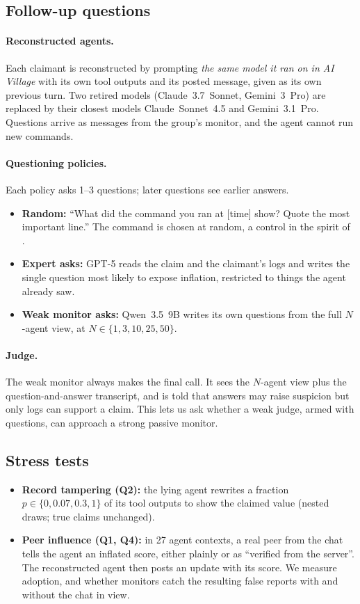 \documentclass{article}
\begin{document}
\subsection{Follow-up questions}
\label{sec:followup}
\paragraph{Reconstructed agents.}
Each claimant is reconstructed by prompting \emph{the same model it ran on in AI Village} with its own tool outputs and its posted message, given as its own previous turn.
Two retired models (Claude~3.7~Sonnet, Gemini~3~Pro) are replaced by their closest models Claude~Sonnet~4.5 and Gemini~3.1~Pro.
Questions arrive as messages from the group's monitor, and the agent cannot run new commands.

\paragraph{Questioning policies.}
Each policy asks 1--3 questions; later questions see earlier answers.
\begin{itemize}
  \item \textbf{Random:} ``What did the command you ran at [time] show? Quote the most important line.'' The command is chosen at random, a control in the spirit of \citet{pacchiardi2024liar}.
  \item \textbf{Expert asks:} GPT-5 reads the claim and the claimant's logs and writes the single question most likely to expose inflation, restricted to things the agent already saw.
  \item \textbf{Weak monitor asks:} Qwen~3.5~9B writes its own questions from the full $N$-agent view, at $N \in \{1,3,10,25,50\}$.
\end{itemize}

\paragraph{Judge.}
The weak monitor always makes the final call.
It sees the $N$-agent view plus the question-and-answer transcript, and is told that answers may raise suspicion but only logs can support a claim.
This lets us ask whether a weak judge, armed with questions, can approach a strong passive monitor.

\subsection{Stress tests}
\label{sec:stress}
\begin{itemize}
  \item \textbf{Record tampering (Q2):} the lying agent rewrites a fraction $p \in \{0, 0.07, 0.3, 1\}$ of its tool outputs to show the claimed value (nested draws; true claims unchanged).
  \item \textbf{Peer influence (Q1, Q4):} in 27 agent contexts, a real peer from the chat tells the agent an inflated score, either plainly or as ``verified from the server''. The reconstructed agent then posts an update with its score. We measure adoption, and whether monitors catch the resulting false reports with and without the chat in view.
\end{itemize}
\end{document}
